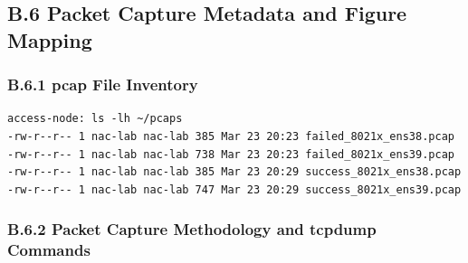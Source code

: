 \documentclass[11pt]{article}
\begin{document}

\subsection{B.6 Packet Capture Metadata and Figure Mapping}
\label{sec:appendix-b-packet-capture-metadata-and-figure-mapping}


\subsubsection{B.6.1 pcap File Inventory}
\label{sec:appendix-b-pcap-file-inventory}

\begin{verbatim}
access-node: ls -lh ~/pcaps
-rw-r--r-- 1 nac-lab nac-lab 385 Mar 23 20:23 failed_8021x_ens38.pcap
-rw-r--r-- 1 nac-lab nac-lab 738 Mar 23 20:23 failed_8021x_ens39.pcap
-rw-r--r-- 1 nac-lab nac-lab 385 Mar 23 20:29 success_8021x_ens38.pcap
-rw-r--r-- 1 nac-lab nac-lab 747 Mar 23 20:29 success_8021x_ens39.pcap
\end{verbatim}


\subsubsection{B.6.2 Packet Capture Methodology and tcpdump Commands}
\label{sec:appendix-b-packet-capture-methodology-and-tcpdump-commands}
\end{document}
